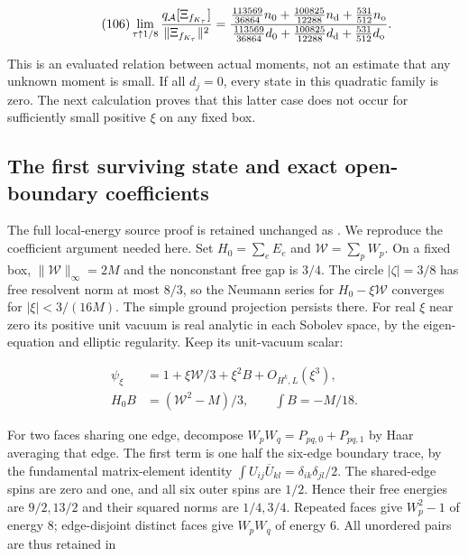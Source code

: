 \[
\qquad\text{(106)}
 \lim_{\tau\uparrow1/8}
 \frac{q_{\mathcal A}[\Xi_{f_{K_\tau}}]}{\|\Xi_{f_{K_\tau}}\|^2}
 =
 \frac{\frac{113569}{36864}n_0+
       \frac{100825}{12288}n_{\rm d}+\frac{531}{512}n_{\rm o}}
      {\frac{113569}{36864}d_0+
       \frac{100825}{12288}d_{\rm d}+\frac{531}{512}d_{\rm o}} .
\]

This is an evaluated relation between actual moments, not an estimate
that any unknown moment is small. If all \(d_j=0\), every state in this
quadratic family is zero. The next calculation proves that this latter
case does not occur for sufficiently small positive \(\xi\) on any fixed
box.

\subsection{The first surviving state and exact open-boundary
coefficients}\label{fabel-tensor-transfer-md-the-first-surviving-state-and-exact-open-boundary-coefficients}

The full local-energy source proof is retained unchanged as . We
reproduce the coefficient argument needed here. Set \(H_0=\sum_eE_e\)
and \(\mathcal W=\sum_pW_p\). On a fixed box,
\(\|\mathcal W\|_\infty=2M\) and the nonconstant free gap is \(3/4\).
The circle \(|\zeta|=3/8\) has free resolvent norm at most \(8/3\), so
the Neumann series for \(H_0-\xi\mathcal W\) converges for
\(|\xi|<3/(16M)\). The simple ground projection persists there. For real
\(\xi\) near zero its positive unit vacuum is real analytic in each
Sobolev space, by the eigen-equation and elliptic regularity. Keep its
unit-vacuum scalar:

\[
\begin{aligned}
 \psi_\xi&=1+\xi\mathcal W/3+\xi^2 B+O_{H^k,L}(\xi^3),\\
 H_0B&=(\mathcal W^2-M)/3,\qquad \int B=-M/18.
\end{aligned}
\]

For two faces sharing one edge, decompose \(W_pW_q=P_{pq,0}+P_{pq,1}\)
by Haar averaging that edge. The first term is one half the six-edge
boundary trace, by the fundamental matrix-element identity
\(\int U_{ij}\overline U_{kl}
=\delta_{ik}\delta_{jl}/2\). The shared-edge spins are zero and one, and
all six outer spins are \(1/2\). Hence their free energies are
\(9/2,13/2\) and their squared norms are \(1/4,3/4\). Repeated faces
give \(W_p^2-1\) of energy \(8\); edge-disjoint distinct faces give
\(W_pW_q\) of energy \(6\). All unordered pairs are thus retained in

